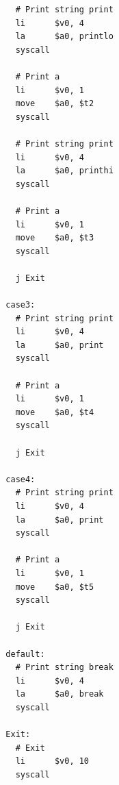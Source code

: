 \documentclass[12pt,a4paper]{article}
\begin{document}
\begin{mdframed}[hidealllines=true,backgroundcolor=magenta!10]
\begin{lstlisting}
    # Print string print
    li      $v0, 4
    la      $a0, printlo
    syscall

    # Print a
    li      $v0, 1
    move    $a0, $t2
    syscall

    # Print string print
    li      $v0, 4
    la      $a0, printhi
    syscall

    # Print a
    li      $v0, 1
    move    $a0, $t3
    syscall

    j Exit

  case3:
    # Print string print
    li      $v0, 4
    la      $a0, print
    syscall

    # Print a
    li      $v0, 1
    move    $a0, $t4
    syscall

    j Exit

  case4:
    # Print string print
    li      $v0, 4
    la      $a0, print
    syscall

    # Print a
    li      $v0, 1
    move    $a0, $t5
    syscall

    j Exit

  default:
    # Print string break
    li      $v0, 4
    la      $a0, break
    syscall

  Exit:
    # Exit
    li      $v0, 10
    syscall

  \end{lstlisting}
\end{mdframed}
\end{document}
